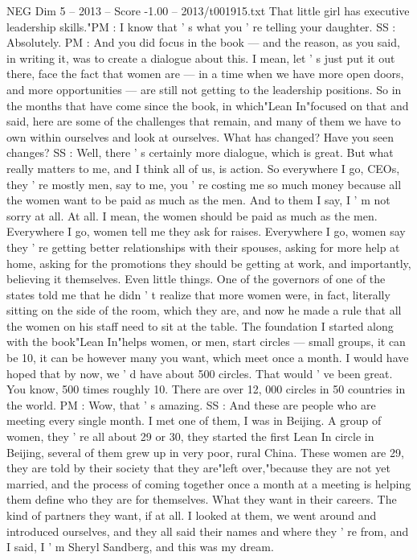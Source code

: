\begin{textsample}{NEG Dim 5 – 2013 – Score -1.00 – 2013/t001915.txt}
That little girl has executive leadership skills."PM : I know that ' s what you ' re telling your daughter.
SS : Absolutely.
PM : And you did focus in the book — and the reason, as you said, in writing it, was to create a dialogue about this.
I mean, let ' s just put it out there, face the fact that women are — in a time when we have more open doors, and more opportunities — are still not getting to the leadership positions.
So in the months that have come since the book, in which"Lean In"focused on that and said, here are some of the challenges that remain, and many of them we have to own within ourselves and look at ourselves.
What has changed?
Have you seen changes?
SS : Well, there ' s certainly more dialogue, which is great.
But what really matters to me, and I think all of us, is action.
So everywhere I go, CEOs, they ' re mostly men, say to me, you ' re costing me so much money because all the women want to be paid as much as the men.
And to them I say, I ' m not sorry at all.
At all.
I mean, the women should be paid as much as the men.
Everywhere I go, women tell me they ask for raises.
Everywhere I go, women say they ' re getting better relationships with their spouses, asking for more help at home, asking for the promotions they should be getting at work, and importantly, believing it themselves.
Even little things.
One of the governors of one of the states told me that he didn ' t realize that more women were, in fact, literally sitting on the side of the room, which they are, and now he made a rule that all the women on his staff need to sit at the table.
The foundation I started along with the book"Lean In"helps women, or men, start circles — small groups, it can be 10, it can be however many you want, which meet once a month.
I would have hoped that by now, we ' d have about 500 circles.
That would ' ve been great.
You know, 500 times roughly 10.
There are over 12, 000 circles in 50 countries in the world.
PM : Wow, that ' s amazing.
SS : And these are people who are meeting every single month.
I met one of them, I was in Beijing.
A group of women, they ' re all about 29 or 30, they started the first Lean In circle in Beijing, several of them grew up in very poor, rural China.
These women are 29, they are told by their society that they are"left over,"because they are not yet married, and the process of coming together once a month at a meeting is helping them define who they are for themselves.
What they want in their careers.
The kind of partners they want, if at all.
I looked at them, we went around and introduced ourselves, and they all said their names and where they ' re from, and I said, I ' m Sheryl Sandberg, and this was my dream.

\end{textsample}
